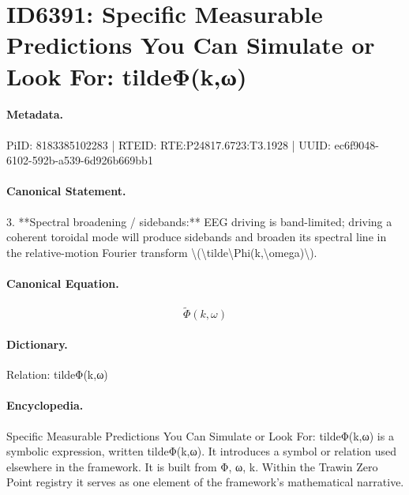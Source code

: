 \section*{ID6391: Specific Measurable Predictions You Can Simulate or Look For: tildeΦ(k,ω)}
\paragraph{Metadata.}
PiID: 8183385102283 | RTEID: RTE:P24817.6723:T3.1928 | UUID: ec6f9048-6102-592b-a539-6d926b669bb1

\paragraph{Canonical Statement.}
3. **Spectral broadening / sidebands:** EEG driving is band-limited; driving a coherent toroidal mode will produce sidebands and broaden its spectral line in the relative-motion Fourier transform \textbackslash{}(\textbackslash{}tilde\textbackslash{}Phi(k,\textbackslash{}omega)\textbackslash{}).

\paragraph{Canonical Equation.}
\[
\tilde\Phi(k,\omega)
\]

\paragraph{Dictionary.}
Relation: tildeΦ(k,ω)

\paragraph{Encyclopedia.}
Specific Measurable Predictions You Can Simulate or Look For: tildeΦ(k,ω) is a symbolic expression, written tildeΦ(k,ω). It introduces a symbol or relation used elsewhere in the framework. It is built from Φ, ω, k. Within the Trawin Zero Point registry it serves as one element of the framework's mathematical narrative.

